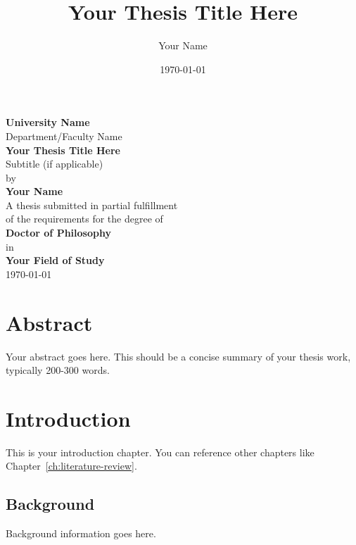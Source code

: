 \documentclass[12pt,a4paper]{report}
\title{Your Thesis Title Here}
\author{Your Name}
\date{\today}
\begin{document}
\begin{titlepage}
    \centering
    \vspace*{2cm}
    
    {\Large\textbf{University Name}}\\[0.5cm]
    {\large Department/Faculty Name}\\[2cm]
    
    {\huge\textbf{Your Thesis Title Here}}\\[1cm]
    {\Large Subtitle (if applicable)}\\[3cm]
    
    {\large by}\\[0.5cm]
    {\Large\textbf{Your Name}}\\[2cm]
    
    {\large A thesis submitted in partial fulfillment\\
    of the requirements for the degree of\\[0.5cm]
    \textbf{Doctor of Philosophy}\\
    in\\
    \textbf{Your Field of Study}}\\[2cm]
    
    {\large\today}
    
    \vfill
\end{titlepage}

\chapter*{Abstract}

Your abstract goes here. This should be a concise summary of your thesis work, typically 200-300 words.

\tableofcontents
\newpage

\listoffigures
\newpage

\listoftables
\newpage

\chapter{Introduction}
\label{ch:introduction}

This is your introduction chapter. You can reference other chapters like Chapter~\ref{ch:literature-review}.

\section{Background}
Background information goes here.
\end{document}
